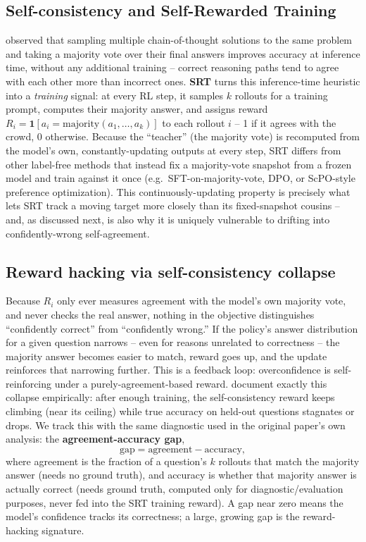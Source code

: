 \documentclass{article}
\begin{document}
\subsection{Self-consistency and Self-Rewarded Training}

\citet{wang2022selfconsistency} observed that sampling multiple
chain-of-thought solutions to the same problem and taking a majority vote
over their final answers improves accuracy at inference time, without any
additional training -- correct reasoning paths tend to agree with each
other more than incorrect ones. \textbf{SRT} \citep{shafayat2025srt} turns
this inference-time heuristic into a \emph{training} signal: at every RL
step, it samples $k$ rollouts for a training prompt, computes their majority
answer, and assigns reward $R_i = \mathbf{1}[a_i = \text{majority}(a_1,\dots,a_k)]$
to each rollout $i$ -- 1 if it agrees with the crowd, 0 otherwise. Because the
``teacher'' (the majority vote) is recomputed from the model's own,
constantly-updating outputs at every step, SRT differs from other
label-free methods that instead fix a majority-vote snapshot from a frozen
model and train against it once (e.g.\ SFT-on-majority-vote, DPO, or
ScPO-style preference optimization). This continuously-updating property is
precisely what lets SRT track a moving target more closely than its
fixed-snapshot cousins -- and, as discussed next, is also why it is
uniquely vulnerable to drifting into confidently-wrong self-agreement.

\subsection{Reward hacking via self-consistency collapse}

Because $R_i$ only ever measures agreement with the model's own majority
vote, and never checks the real answer, nothing in the objective
distinguishes ``confidently correct'' from ``confidently wrong.'' If the
policy's answer distribution for a given question narrows -- even for
reasons unrelated to correctness -- the majority answer becomes easier to
match, reward goes up, and the update reinforces that narrowing further. This
is a feedback loop: overconfidence is self-reinforcing under a
purely-agreement-based reward. \citeauthor{shafayat2025srt} document exactly
this collapse empirically: after enough training, the self-consistency
reward keeps climbing (near its ceiling) while true accuracy on held-out
questions stagnates or drops. We track this with the same diagnostic used in
the original paper's own analysis: the \textbf{agreement-accuracy gap},
\[
\text{gap} = \text{agreement} - \text{accuracy},
\]
where agreement is the fraction of a question's $k$ rollouts that match the
majority answer (needs no ground truth), and accuracy is whether that
majority answer is actually correct (needs ground truth, computed only for
diagnostic/evaluation purposes, never fed into the SRT training reward). A
gap near zero means the model's confidence tracks its correctness; a large,
growing gap is the reward-hacking signature.
\end{document}
